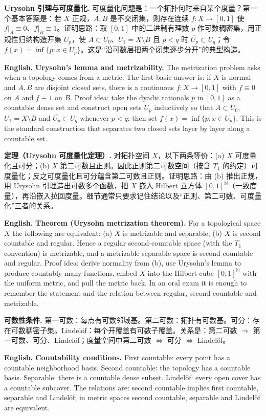 \documentclass[UTF8,11pt,a4paper]{ctexart}
\newcommand{\EN}[1]{\par\noindent\textbf{English.} #1\par}
\begin{document}
\noindent\textbf{Urysohn 引理与可度量化.} 可度量化问题是：一个拓扑何时来自某个度量？第一个基本答案是：若 $X$ 正规，$A,B$ 是不交闭集，则存在连续 $f:X\to[0,1]$ 使 $f|_A\equiv0$、$f|_B\equiv1$。证明思路：取 $[0,1]$ 中的二进制有理数 $p$ 作可数稠密集，用正规性归纳构造开集 $U_p$，使 $A\subset U_0$、$U_1=X\setminus B$ 且 $p<q$ 时 $\overline{U_p}\subset U_q$；令 $f(x)=\inf\{p:x\in U_p\}$。这是“沿可数层把两个闭集逐步分开”的典型构造。
\EN{\textbf{Urysohn's lemma and metrizability.} The metrization problem asks when a topology comes from a metric. The first basic answer is: if $X$ is normal and $A,B$ are disjoint closed sets, there is a continuous $f:X\to[0,1]$ with $f\equiv0$ on $A$ and $f\equiv1$ on $B$. Proof idea: take the dyadic rationals $p$ in $[0,1]$ as a countable dense set and construct open sets $U_p$ inductively so that $A\subset U_0$, $U_1=X\setminus B$ and $\overline{U_p}\subset U_q$ whenever $p<q$; then set $f(x)=\inf\{p:x\in U_p\}$. This is the standard construction that separates two closed sets layer by layer along a countable set.}

\noindent\textbf{定理（Urysohn 可度量化定理）.} 对拓扑空间 $X$，以下两条等价：(a) $X$ 可度量化且可分；(b) $X$ 第二可数且正则。因此正则第二可数空间（按含 $T_1$ 的约定）可度量化；反之可度量化且可分蕴含第二可数且正则。证明思路：由 (b) 推出正规，用 Urysohn 引理造出可数多个函数，把 $X$ 嵌入 Hilbert 立方体 $[0,1]^{\mathbb N}$（一致度量），再沿嵌入拉回度量。细节通常只要求记住结论以及“正则、第二可数、可度量化”三者的关系。
\EN{\textbf{Theorem (Urysohn metrization theorem).} For a topological space $X$ the following are equivalent: (a) $X$ is metrizable and separable; (b) $X$ is second countable and regular. Hence a regular second-countable space (with the $T_1$ convention) is metrizable, and a metrizable separable space is second countable and regular. Proof idea: derive normality from (b), use Urysohn's lemma to produce countably many functions, embed $X$ into the Hilbert cube $[0,1]^{\mathbb N}$ with the uniform metric, and pull the metric back. In an oral exam it is enough to remember the statement and the relation between regular, second countable and metrizable.}

\noindent\textbf{可数性条件.} 第一可数：每点有可数邻域基。第二可数：拓扑有可数基。可分：存在可数稠密子集。Lindel\"of：每个开覆盖有可数子覆盖。关系是：第二可数 $\Rightarrow$ 第一可数、可分、Lindel\"of；度量空间中第二可数 $\Leftrightarrow$ 可分 $\Leftrightarrow$ Lindel\"of。
\EN{\textbf{Countability conditions.} First countable: every point has a countable neighborhood basis. Second countable: the topology has a countable basis. Separable: there is a countable dense subset. Lindel\"of: every open cover has a countable subcover. The relations are: second countable implies first countable, separable and Lindel\"of; in metric spaces second countable, separable and Lindel\"of are equivalent.}
\end{document}
